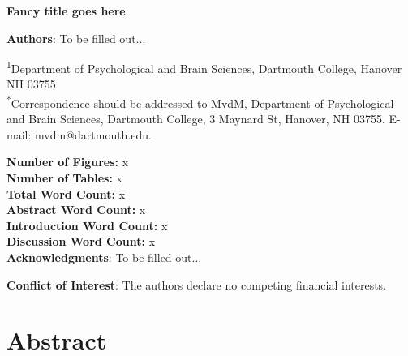 \documentclass[11pt]{article}
\begin{document}
{\Large\bf Fancy title goes here}


{\bf Authors}: To be filled out...

\textsuperscript{1}Department of Psychological and Brain Sciences,
Dartmouth College, Hanover NH
03755\\ %

\textsuperscript{*}Correspondence should be addressed to MvdM,
Department of Psychological and Brain Sciences, Dartmouth College, 3
Maynard St, Hanover, NH 03755. E-mail: {\sffamily mvdm@dartmouth.edu}.

\textbf{Number of Figures:} x\\
\textbf{Number of Tables:} x\\
\textbf{Total Word Count:} x\\
\textbf{Abstract Word Count:} x\\
\textbf{Introduction Word Count:} x\\
\textbf{Discussion Word Count:} x\\

\textbf{Acknowledgments}: To be filled out...

\textbf{Conflict of Interest}: The authors declare no competing
financial interests.\\

\newpage
\linenumbers

\section*{Abstract}
\end{document}
